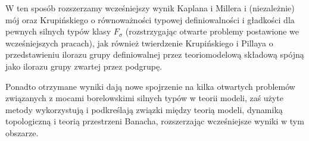 \documentclass[12pt,a4paper]{article}
\begin{document}
	W ten sposób rozszerzamy wcześniejszy wynik Kaplana i Millera i (niezależnie) mój oraz Krupińskiego o równoważności typowej definiowalności i gładkości dla pewnych silnych typów klasy $F_\sigma$ (rozstrzygając otwarte problemy postawione we wcześniejszych pracach), jak również twierdzenie Krupińskiego i Pillaya o przedstawieniu ilorazu grupy definiowalnej przez teoriomodelową składową spójną jako ilorazu grupy zwartej przez podgrupę.
	
	Ponadto otrzymane wyniki dają nowe spojrzenie na kilka otwartych problemów związanych z mocami borelowskimi silnych typów w teorii modeli, zaś użyte metody wykorzystują i podkreślają związki między teorią modeli, dynamiką topologiczną i teorią przestrzeni Banacha, rozszerzając wcześniejsze wyniki w tym obszarze.
\end{document}
